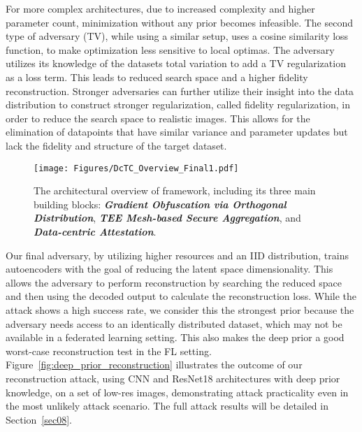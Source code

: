 For more complex architectures, due to increased complexity and higher parameter count, minimization without any prior becomes infeasible. The second type of adversary (\ie TV), while using a similar setup, uses a cosine similarity loss function, to make optimization less sensitive to local optimas. The adversary utilizes its knowledge of the datasets total variation to add a TV regularization as a loss term. This leads to reduced search space and a higher fidelity reconstruction. 
Stronger adversaries can further utilize their insight into the data distribution to construct stronger regularization, called fidelity regularization, in order to reduce the search space to realistic images. This allows for the elimination of datapoints that have similar variance and parameter updates but lack the fidelity and structure of the target dataset.
\begin{figure*}[t]
\centering
  \texttt{[image: Figures/DcTC\_Overview\_Final1.pdf]} 
  \vspace{-0.1in}
  \caption{The architectural overview of \sysname framework, including its three main building blocks: {\it \textbf{Gradient Obfuscation via Orthogonal Distribution}}, {\it \textbf{TEE Mesh-based Secure Aggregation}}, and {\it \textbf{Data-centric Attestation}}.}
  \label{fig:overview}
  \vspace{-0.1in}
\end{figure*}


Our final adversary, by utilizing higher resources and an IID distribution, trains autoencoders with the goal of reducing the latent space dimensionality. This allows the adversary to perform reconstruction by searching the reduced space and then using the decoded output to calculate the reconstruction loss. While the attack shows a high success rate, we consider this the strongest prior because the adversary needs access to an identically distributed dataset, which may not be available in a federated learning setting. This also makes the deep prior a good worst-case reconstruction test in the FL setting. Figure~\ref{fig:deep_prior_reconstruction} illustrates the outcome of our reconstruction attack, using CNN and ResNet18 architectures with deep prior knowledge, on a set of low-res images, demonstrating attack practicality even in the most unlikely attack scenario. The full attack results will be detailed in Section~\ref{sec08}.











